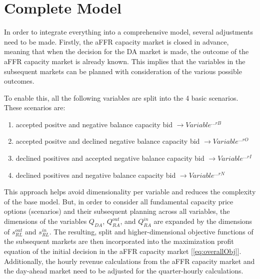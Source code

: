 
\section{Complete Model}
\label{subsec:completeModel}
In order to integrate everything into a comprehensive model, several adjustments need to be made. Firstly,
the aFFR capacity market is closed in advance, meaning that when the decision for the DA market is made,
the outcome of the aFFR capacity market is already known. This implies that the variables in the subsequent markets
can be planned with consideration of the various possible outcomes.

To enable this, all the following variables are split into the 4 basic scenarios. These scenarios are:

\begin{enumerate}
	\item accepted positve and negative balance capacity bid	$\rightarrow Variable^{...rB}$
	\item accepted positve and declined negative balance capacity bid $\rightarrow Variable^{...rO}$
	\item declined positives and accepted negative balance capacity bid $\rightarrow Variable^{...rI}$
	\item declined positives and negative balance capacity bid $\rightarrow Variable^{...rN}$
\end{enumerate}

This approach helps avoid dimensionality per variable and reduces the complexity of the base model.
But, in order to consider all fundamental capacity price options (scenarios) and their subsequent planning
across all variables, the dimensions of the variables $Q_{DA}$, $Q^{out}_{RA}$, and $Q^{in}_{RA}$ are
expanded by the dimensions of $s^{out}_{RL}$ and $s^{in}_{RL}$. The resulting, split and higher-dimensional
objective functions of the subsequent markets are then incorporated into the maximization profit equation of
the initial decision in the aFFR capacity market [\ref{eq:overallObj}]. Additionally, the hourly revenue calculations
from the aFFR capacity market and the day-ahead market need to be adjusted for the quarter-hourly calculations.

